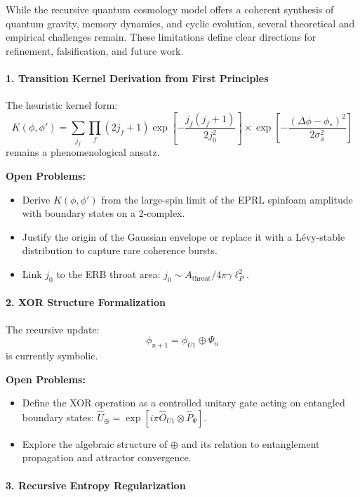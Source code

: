 While the recursive quantum cosmology model offers a coherent synthesis of quantum gravity, memory dynamics, and cyclic evolution, several theoretical and empirical challenges remain. These limitations define clear directions for refinement, falsification, and future work.

\paragraph{1. Transition Kernel Derivation from First Principles}

The heuristic kernel form:
\[
K(\phi, \phi') = \sum_{j_f} \prod_f (2j_f+1) \exp\left[-\frac{j_f(j_f+1)}{2j_0^2}\right] \times \exp\left[-\frac{(\Delta\phi - \phi_*)^2}{2\sigma_\phi^2}\right]
\]
remains a phenomenological ansatz.

\textbf{Open Problems:}
\begin{itemize}
    \item Derive \( K(\phi, \phi') \) from the large-spin limit of the EPRL spinfoam amplitude with boundary states on a 2-complex.
    \item Justify the origin of the Gaussian envelope or replace it with a Lévy-stable distribution to capture rare coherence bursts.
    \item Link \( j_0 \) to the ERB throat area: \( j_0 \sim A_{\text{throat}} / 4\pi \gamma \ell_P^2 \).
\end{itemize}

\paragraph{2. XOR Structure Formalization}

The recursive update:
\[
\phi_{n+1} = \phi_{U1} \oplus \Psi_n
\]
is currently symbolic.

\textbf{Open Problems:}
\begin{itemize}
    \item Define the XOR operation as a controlled unitary gate acting on entangled boundary states: \( \hat{U}_\oplus = \exp[i\pi \hat{O}_{U1} \otimes \hat{P}_{\Psi}] \).
    \item Explore the algebraic structure of \( \oplus \) and its relation to entanglement propagation and attractor convergence.
\end{itemize}

\paragraph{3. Recursive Entropy Regularization}

